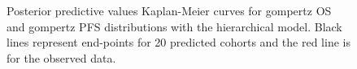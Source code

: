\documentclass[AMA,STIX1COL]{WileyNJD-v2}
\begin{document}
\begin{figure}[H]
    \centering
    \qquad
    \caption{Posterior predictive values Kaplan-Meier curves for gompertz OS and gompertz PFS distributions with the hierarchical model. Black lines represent end-points for 20 predicted cohorts and the red line is for the observed data.}%
\end{figure}

\newpage






\end{document}
